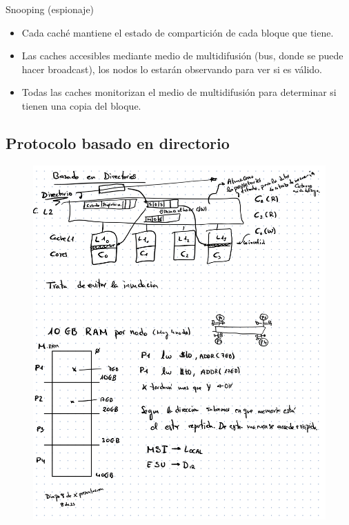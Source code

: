 \documentclass[12pt, twoside, openright]{report} %
\begin{document}
      Snooping (espionaje)

      \begin{itemize}
      
      \item
        Cada caché mantiene el estado de compartición de cada bloque
        que tiene.
      \item
        Las caches accesibles mediante medio de multidifusión (bus,
        donde se puede hacer broadcast), los nodos lo estarán
        observando para ver si es válido.
      \item
        Todas las caches monitorizan el medio de multidifusión para
        determinar si tienen una copia del bloque.
      \end{itemize}

      
\subsection{Protocolo basado en directorio}
\begin{figure}[H]
	{\includegraphics[scale=.3]{Untitled 47.png}}
\end{figure}
\end{document}
